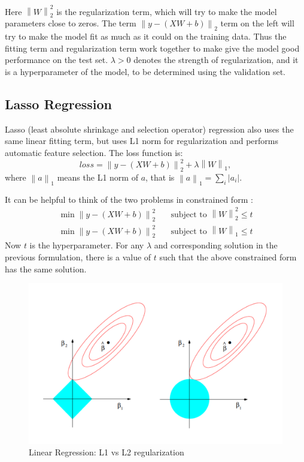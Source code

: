 \documentclass[a4paper]{article}
\newcommand{\norm}[1]{\left\lVert#1\right\rVert}
\begin{document}
Here $\norm{W}^2_2$ is the regularization term, which will try to make the model parameters close to zeros. The term $\norm{y - (XW+b)}_2$ term on the left will try to make the model fit as much as it could on the training data. Thus the fitting term and regularization term work together to make give the model good performance on the test set. $\lambda > 0$ denotes the strength of regularization, and it is a hyperparameter of the model, to be determined using the validation set. 

\subsection{Lasso Regression}
Lasso (least absolute shrinkage and selection operator) regression also uses the same linear fitting term, but uses L1 norm for regularization and performs automatic feature selection. The loss function is:
\begin{equation}
  loss = \norm{y - (XW+b)}^2_2  + \lambda \norm{W}_1,
\end{equation}
where $\norm{a}_1$ means the L1 norm of $a$, that is $\norm{a}_1 = \sum_i |a_i|$.

It can be helpful to think of the two problems in constrained form \citep{cmuLasso}:
\begin{align}
  \min \norm{y - (XW+b)}^2_2  & \quad \text{subject to } \norm{W}^2_2 \leq t \\
  \min \norm{y - (XW+b)}^2_2  & \quad \text{subject to } \norm{W}_1 \leq t
\end{align}
Now $t$ is the hyperparameter. For any $\lambda$ and corresponding solution in the previous formulation, there is a value of $t$ such that the above constrained form has the same solution.

\begin{figure}[H]
\includegraphics[width=\textwidth]{lasso_ridge.png}
\caption{Linear Regression: L1 vs L2 regularization}
\end{figure}
\end{document}
